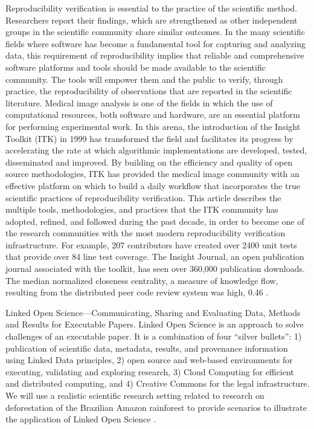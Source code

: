 Reproducibility verification is essential to the practice of the scientific method.
Researchers report their findings, which are strengthened as other independent groups
in the scientific community share similar outcomes. In the many scientific fields
where software has become a fundamental tool for capturing and analyzing data, this
requirement of reproducibility implies that reliable and comprehensive software platforms
and tools should be made available to the scientific community. The tools will empower
them and the public to verify, through practice, the reproducibility of observations that
are reported in the scientific literature. Medical image analysis is one of the fields in
which the use of computational resources, both software and hardware, are an essential
platform for performing experimental work. In this arena, the introduction of the Insight
Toolkit (ITK) in 1999 has transformed the field and facilitates its progress by accelerating
the rate at which algorithmic implementations are developed, tested, disseminated and
improved. By building on the efficiency and quality of open source methodologies, ITK has
provided the medical image community with an effective platform on which to build a daily
workflow that incorporates the true scientific practices of reproducibility verification. This
article describes the multiple tools, methodologies, and practices that the ITK community
has adopted, refined, and followed during the past decade, in order to become one of the
research communities with the most modern reproducibility verification infrastructure. For
example, 207 contributors have created over 2400 unit tests that provide over 84%
line test coverage. The Insight Journal, an open publication journal associated with the
toolkit, has seen over 360,000 publication downloads. The median normalized closeness
centrality, a measure of knowledge flow, resulting from the distributed peer code review
system was high, 0.46 \cite{McCormick2014}.

Linked Open Science—Communicating, Sharing and Evaluating
Data, Methods and Results for Executable Papers.
Linked Open Science is an approach to solve challenges of an executable paper. It is a combination of four “silver
bullets”: 1) publication of scientific data, metadata, results, and provenance information using Linked Data principles,
2) open source and web-based environments for executing, validating and exploring research, 3) Cloud Computing
for efficient and distributed computing, and 4) Creative Commons for the legal infrastructure. We will use a realistic
scientific research setting related to research on deforestation of the Brazilian Amazon rainforest to provide scenarios
to illustrate the application of Linked Open Science \cite{Kauppinen2011}.

